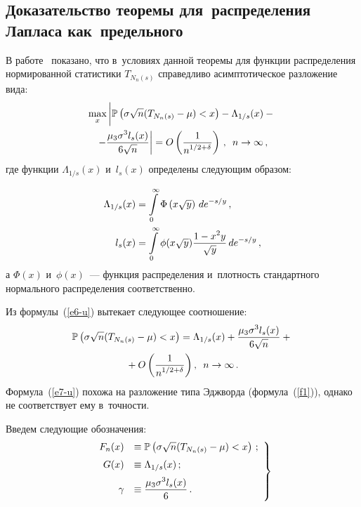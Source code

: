 \begin{multicols}{2}
\subsection{Доказательство теоремы для~распределения Лапласа как~предельного}

В работе~\cite{BenKorGal} показано, что в~условиях данной теоремы 
для функции распределения нормированной статистики $T_{N_{n}(s)}$ справедливо 
асимптотическое разложение вида:
\begin{multline}
\label{e6-u}
\max\limits_{x} \left|
\vphantom{\fr{\mu_{3}\sigma^{3}l_{s}(x)}{6\sqrt{n}}}
\mathbb{P}\left( \sigma\sqrt{n}(T_{N_{n}(s)}-\mu)<x\right)
-\Lambda_{1/s}(x) - {} \right.\\
\left.- \fr{\mu_{3}\sigma^{3}l_{s}(x)}{6\sqrt{n}}\right|= 
O\left(\fr{1}{n^{1/2+\delta}}\right)\,,\enskip n \rightarrow\infty\,,
\end{multline}
где функции $\Lambda_{1/s}(x)$ и~$l_{s}(x)$ определены следующим образом: 

\noindent 
\begin{align*}
 \Lambda_{1/s}(x) &= \int\limits^{\infty}\limits_{0}{\Phi\left(x\sqrt{y}\right)\,de^{-s/y}}\,, \\
 l_{s}(x)&=\int\limits^{\infty}\limits_{0}{\phi(x\sqrt{y})\displaystyle\frac{\displaystyle 1-x^{2}y\mathstrut}{\displaystyle \sqrt{y}\mathstrut}\,de^{-s/y}}\,, 
 \end{align*}
а $\Phi(x)$ и~$\phi(x)$~--- функция распределения и~плотность стандартного нормального 
распределения соответственно.

Из формулы~(\ref{e6-u}) вытекает следующее соотношение:  
\begin{multline}
\label{e7-u}
\mathbb{P}\left( \sigma\sqrt{n}(T_{N_{n}(s)}-\mu)<x\right)= 
\Lambda_{1/s}(x) + \displaystyle\frac{\displaystyle \mu_{3}\sigma^{3}l_{s}(x)\mathstrut}{\displaystyle 6\sqrt{n}\mathstrut} + {}\\
{}+O\left(\displaystyle\frac{\displaystyle 1\mathstrut}{\displaystyle n^{1/2+\delta}\mathstrut}\right),\enskip n \rightarrow\infty\,.
\end{multline}
Формула~(\ref{e7-u}) похожа на разложение типа Эджворда (формула~(\ref{f1})), 
однако  не соответствует ему в~точ\-ности.

Введем следующие обозначения: 
\begin{equation}
\left.
\begin{array}{rl}
 F_{n}(x)&\equiv\mathbb{P}\left( \sigma\sqrt{n}(T_{N_{n}(s)}-\mu)<x\right)\,;\\[6pt]
 G(x) &\equiv \Lambda_{1/s}(x)\,; \\[6pt]
 \gamma &\equiv \displaystyle\displaystyle\frac{\displaystyle \mu_{3}\sigma^{3}l_{s}(x)\mathstrut}{\displaystyle 6\mathstrut}\,. 
\end{array}
\right\}
\label{e8-u}
\end{equation}


\end{multicols}
